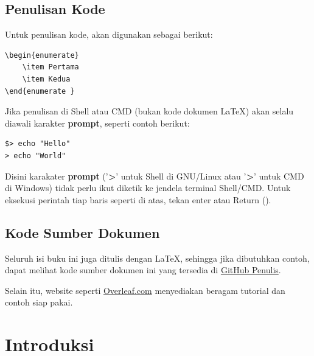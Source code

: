 \documentclass{book} %
\begin{document}
	\section{Penulisan Kode}
	Untuk penulisan kode, akan digunakan sebagai berikut:

    \begin{verbatim}
\begin{enumerate}
    \item Pertama
    \item Kedua
\end{enumerate }
    \end{verbatim}

	Jika penulisan di Shell atau CMD (bukan kode dokumen \LaTeX) akan selalu diawali karakter \textbf{prompt}, seperti contoh berikut:

	\begin{verbatim}
$> echo "Hello"
> echo "World"
	\end{verbatim}

	Disini karakater \textbf{prompt} ('\textbf{\textdollar\textgreater}' untuk Shell di GNU/Linux atau '\textbf{\textgreater}' untuk CMD di Windows) tidak perlu ikut diketik ke jendela terminal Shell/CMD.
	Untuk eksekusi perintah tiap baris seperti di atas, tekan enter atau Return (\keys{\return}).

    \section{Kode Sumber Dokumen}

    Seluruh isi buku ini juga ditulis dengan \LaTeX{}, sehingga jika dibutuhkan contoh, dapat melihat
    kode sumber dokumen ini yang tersedia di \href{https://github.com/mekatronik-achmadi/my_latexbook/blob/master/Modul/LaTex/latex_beginner.tex}{GitHub Penulis}.

    \bigskip

    Selain itu, website seperti \href{https://www.overleaf.com/}{Overleaf.com} menyediakan beragam tutorial dan contoh siap pakai.


    \mainmatter %

    \newpage
    \chapter{Introduksi}
\end{document}
